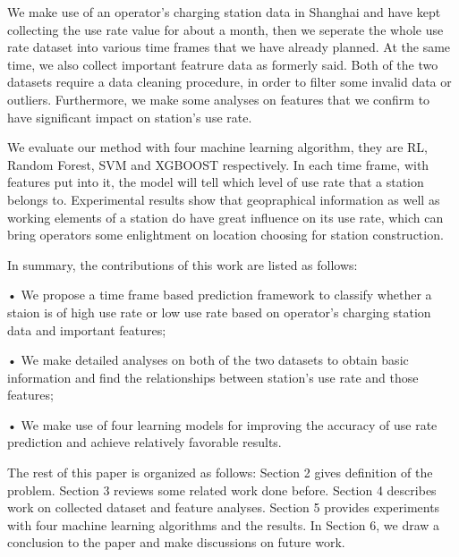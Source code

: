 \documentclass[conference]{IEEEtran}
\begin{document}
We make use of an operator's charging station data in Shanghai and  have kept collecting the use rate value for about a month, then we seperate the whole use rate dataset into various time frames that we have already planned. At the same time, we also collect important featrure data as formerly said. Both of the two datasets require a data cleaning procedure, in order to filter some invalid data or outliers. Furthermore, we make some analyses on features that we confirm to have significant impact on station's use rate.

We evaluate our method with four machine learning algorithm, they are RL, Random Forest, SVM and XGBOOST respectively. In each time frame, with features put into it, the model will tell which level of use rate that a station belongs to. Experimental results show that geopraphical information as well as working elements of a station do have great influence on its use rate, which can bring operators some enlightment on location choosing for station construction.

In summary, the contributions of this work are listed as follows:
\begin{spacing}{1.0}
\end{spacing} 
\begin{adjustwidth}{2em}
	\qquad• We propose a time frame based prediction framework to classify whether a staion is of high use rate or low use rate based on operator's charging station data and important features;
\end{adjustwidth}

\begin{adjustwidth}{2em}
	\qquad• We make detailed analyses on both of the two datasets to obtain basic information and find the relationships between station's use rate and those features;
\end{adjustwidth}
	
\begin{adjustwidth}{2em}
	\qquad• We make use of four learning models for improving the accuracy of use rate prediction and achieve relatively favorable results.
\end{adjustwidth}
\vspace{10pt}
\par The rest of this paper is organized as follows: Section 2 gives definition of the problem. Section 3 reviews some related work done before. Section 4 describes work on collected dataset and feature analyses. Section 5 provides experiments with four machine learning algorithms and the results. In Section 6, we draw a conclusion to the paper and make discussions on future work.
\end{document}
